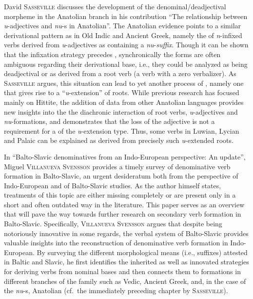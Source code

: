 \documentclass[output=paper,colorlinks,citecolor=brown]{langscibook}
\begin{document}
David \textsc{Sasseville} discusses the development of the denominal/deadjectival   morpheme  in the Anatolian branch in his contribution ``The relationship between \textit{u}-adjectives and \textit{nu}-s in Anatolian''. The Anatolian evidence points to a similar derivational pattern as in Old Indic and Ancient Greek, namely the  of \textit{n}-infixed verbs derived from \textit{u}-adjectives as containing a \textit{nu}-\emph{suffix}. Though it can be shown that the infixation strategy precedes , synchronically the forms are often ambiguous regarding their derivational base, i.e., they could be analyzed as being deadjectival or as derived from a root verb (a verb with a zero verbalizer). As \textsc{Sasseville} argues, this situation can lead to yet another process of , namely one that gives rise to a ``\textit{u}-extension'' of roots. While previous research has focused mainly on Hittite, the addition of data from  other Anatolian languages  provides new insights into the the diachronic interaction of root verbs, \textit{u}-adjectives and \textit{nu}-formations, and demonstrates that the loss of the adjective is not a requirement for a  of the \textit{u}-extension type. Thus, some verbs in Luwian, Lycian and Palaic can be explained as derived from precisely such \textit{u}-extended roots. 

In ``Balto-Slavic denominatives from an Indo-European perspective: An update'', Miguel \textsc{Villanueva Svensson} provides a timely survey of denominative verb formation in Balto-Slavic, an urgent desideratum both from the perspective of Indo-European and of Balto-Slavic studies. As the author himself states, treatments of this topic are either missing completely or are present only in a short and often outdated way in the literature. This paper serves as an overview that will pave the way towards further research on secondary verb formation in Balto-Slavic. Specifically, \textsc{Villanueva Svensson} argues that despite being notoriously innovative in some regards, the verbal system of Balto-Slavic provides valuable insights into the reconstruction of denominative verb formation in Indo-European. By surveying the different morphological means (i.e., suffixes) attested in Baltic and Slavic, he first identifies the inherited as well as innovated strategies for deriving verbs from nominal bases and then connects them to formations in different branches of the family such as Vedic, Ancient  Greek, and, in the case of the \textit{nu}-s, Anatolian (cf.\ the immediately preceding chapter by \textsc{Sasseville}). 
\end{document}
